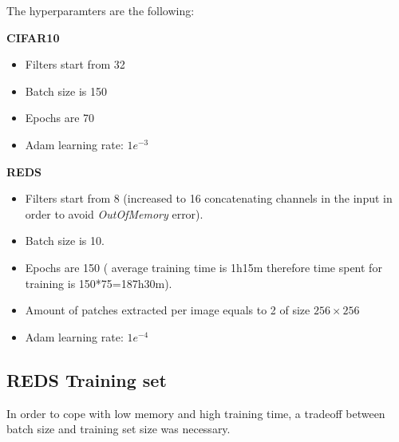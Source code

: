 The hyperparamters are the following:
\begin{center}
    \begin{minipage}[t]{0.5\textwidth}
        \textbf{CIFAR10}
        \begin{itemize}
            \item Filters start from 32
            \item Batch size is 150
            \item Epochs are 70
            \item Adam learning rate: $1e^{-3}$
        \end{itemize}
    \end{minipage}%
    \begin{minipage}[t]{0.5\textwidth}
        \textbf{REDS}
        \begin{itemize}
            \item Filters start from 8 (increased to 16 concatenating channels in the input in order to avoid \textit{OutOfMemory} error).
            \item Batch size is 10.
            \item Epochs are 150 ( average training time is 1h15m therefore time spent for training is 150*75=187h30m).
            \item Amount of patches extracted per image equals to 2 of size $256 \times 256$
            \item Adam learning rate: $1e^{-4}$
        \end{itemize}
    \end{minipage}        
\end{center}

\subsection{REDS Training set}

In order to cope with low memory and high training time, a tradeoff between batch size and training set size was necessary. 

